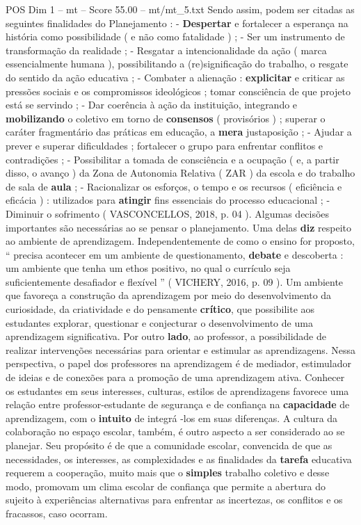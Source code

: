 \begin{textsample}{POS Dim 1 – mt – Score 55.00 – mt/mt\_5.txt}
Sendo assim, podem ser citadas as seguintes finalidades do Planejamento : - \textbf{Despertar} e fortalecer a esperança na história como possibilidade ( e não como fatalidade ) ; - Ser um instrumento de transformação da realidade ; - Resgatar a intencionalidade da ação ( marca essencialmente humana ), possibilitando a (re)significação do trabalho, o resgate do sentido da ação educativa ; - Combater a alienação : \textbf{explicitar} e criticar as pressões sociais e os compromissos ideológicos ; tomar consciência de que projeto está se servindo ; - Dar coerência à ação da instituição, integrando e \textbf{mobilizando} o coletivo em torno de \textbf{consensos} ( provisórios ) ; superar o caráter fragmentário das práticas em educação, a \textbf{mera} justaposição ; - Ajudar a prever e superar dificuldades ; fortalecer o grupo para enfrentar conflitos e contradições ; - Possibilitar a tomada de consciência e a ocupação ( e, a partir disso, o avanço ) da Zona de Autonomia Relativa ( ZAR ) da escola e do trabalho de sala de \textbf{aula} ; - Racionalizar os esforços, o tempo e os recursos ( eficiência e eficácia ) : utilizados para \textbf{atingir} fins essenciais do processo educacional ; - Diminuir o sofrimento ( VASCONCELLOS, 2018, p. 04 ).
Algumas decisões importantes são necessárias ao se pensar o planejamento.
Uma delas \textbf{diz} respeito ao ambiente de aprendizagem.
Independentemente de como o ensino for proposto, “ precisa acontecer em um ambiente de questionamento, \textbf{debate} e descoberta : um ambiente que tenha um ethos positivo, no qual o currículo seja suficientemente desafiador e flexível ” ( VICHERY, 2016, p. 09 ).
Um ambiente que favoreça a construção da aprendizagem por meio do desenvolvimento da curiosidade, da criatividade e do pensamente \textbf{crítico}, que possibilite aos estudantes explorar, questionar e conjecturar o desenvolvimento de uma aprendizagem significativa.
Por outro \textbf{lado}, ao professor, a possibilidade de realizar intervenções necessárias para orientar e estimular as aprendizagens.
Nessa perspectiva, o papel dos professores na aprendizagem é de mediador, estimulador de ideias e de conexões para a promoção de uma aprendizagem ativa.
Conhecer os estudantes em seus interesses, culturas, estilos de aprendizagens favorece uma relação entre professor-estudante de segurança e de confiança na \textbf{capacidade} de aprendizagem, com o \textbf{intuito} de integrá -los em suas diferenças.
A cultura da colaboração no espaço escolar, também, é outro aspecto a ser considerado ao se planejar.
Seu propósito é de que a comunidade escolar, convencida de que as necessidades, os interesses, as complexidades e as finalidades da \textbf{tarefa} educativa requerem a cooperação, muito mais que o \textbf{simples} trabalho coletivo e desse modo, promovam um clima escolar de confiança que permite a abertura do sujeito à experiências alternativas para enfrentar as incertezas, os conflitos e os fracassos, caso ocorram.

\end{textsample}
